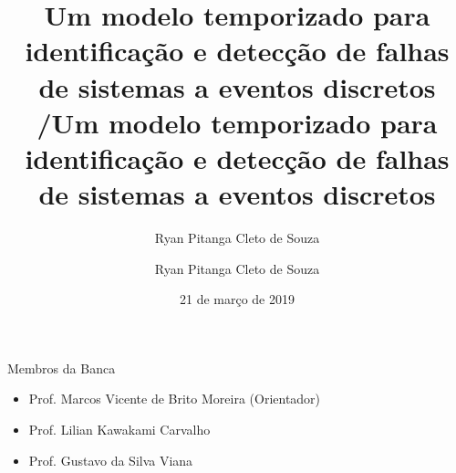 \documentclass[xcolor=x11names,compress,framenumber]{beamer}
\title{Um modelo temporizado para identificação e detecção de falhas de sistemas a eventos discretos \hspace{2.3cm} \insertframenumber/\inserttotalframenumber}
\author{Ryan Pitanga Cleto de Souza}
\institute{DEE-UFRJ}
\renewcommand{\(}{\begin{columns}}
\renewcommand{\)}{\end{columns}}
\newcommand{\<}[1]{\begin{column}{#1}}
\renewcommand{\>}{\end{column}}
\begin{document}


{

\begin{frame}[plain]
\vspace*{8mm}
\title{Um modelo temporizado para identificação e detecção de falhas de sistemas a eventos discretos}
\author{\vspace{-.3cm} Ryan Pitanga Cleto de Souza
	}
\date{\vspace{1cm} 21 de março de 2019}
\titlepage
\end{frame}
}



\begin{frame}{Membros da Banca}


\begin{itemize}
 \item Prof. Marcos Vicente de Brito Moreira (Orientador) \\
 \item Prof. Lilian Kawakami Carvalho \\
 \item Prof. Gustavo da Silva Viana \\
\end{itemize}

\end{frame}
\end{document}
